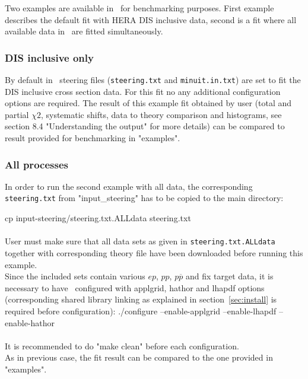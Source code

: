 
\label{section:example}
Two examples are available in \fitter\ for benchmarking purposes.
First example describes the default fit with HERA DIS inclusive data,
second is a fit where all available data in \fitter\ are fitted simultaneously.

\subsubsection{DIS inclusive only}
By default in \fitter\ steering files ({\tt steering.txt} and {\tt minuit.in.txt})
are set to fit the DIS inclusive cross section data. For this fit no any additional
configuration options are required.
The result of this example fit obtained by user (total and partial $\chi2$, systematic shifts, 
data to theory comparison and histograms, see section 8.4 "Understanding the output" for more details) 
can be compared to result provided for benchmarking in "examples".

\subsubsection{All processes}
In order to run the second example with all data, the corresponding
{\tt steering.txt} from "input\_steering" has to be copied to the main directory:

\goodbreak                 
cp input-steering/steering.txt.ALLdata steering.txt
\\ \\
User must make sure that all data sets as given in {\tt steering.txt.ALLdata} together with corresponding theory file have been downloaded  
before running this example. 
\\
Since the included sets contain various $ep$, $pp$, $p \overline p$ and fix target
data, it is necessary to have \fitter\ configured with applgrid, hathor and 
lhapdf options (corresponding shared library linking as explained in section~\ref{sec:install} is
required before configuration): 
\goodbreak
./configure --enable-applgrid --enable-lhapdf --enable-hathor
\\ \\
It is recommended to do "make clean" before each configuration. \\        
As in previous case, the fit result can be compared to the one provided in "examples".



